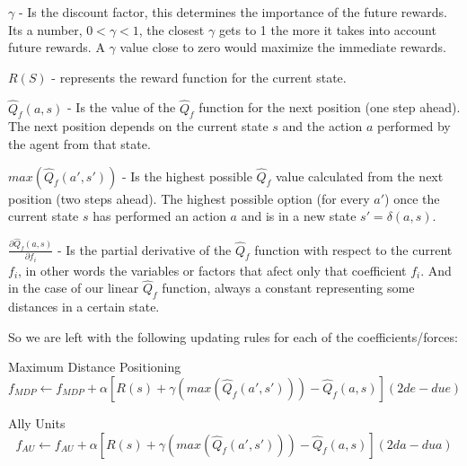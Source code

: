 \begin{flushleft}
$\gamma$  - Is the discount factor, this determines the importance of the future rewards. Its a number, $0 < \gamma < 1$, the closest $\gamma$ gets to 1 the more it takes into account future rewards. A $\gamma$ value close to zero would maximize the immediate rewards. 
\end{flushleft} 

\begin{flushleft}
$R(S)$ -  represents the reward function for the current state.
\end{flushleft} 

\begin{flushleft}
$\hat{Q}_f(a,s)$ - Is the value of the $\hat{Q}_f$ function for the next position (one step ahead). The next position depends on the current state $s$ and the action $a$ performed by the agent from that state.
\end{flushleft} 

\begin{flushleft}
$max(\hat{Q}_f(a',s'))$ - Is the highest possible $\hat{Q}_f$ value calculated from the next position (two steps ahead). The highest possible option (for every $a'$) once the current state $s$ has performed an action $a$ and is in a new state $s' = \delta(a,s)$. 
\end{flushleft} 

\begin{flushleft}
$\frac{\partial \hat{Q}_f(a,s)}{\partial f_i}$  - Is the partial derivative of the $\hat{Q}_f$ function with respect to the current $f_i$, in other words the variables or factors that afect only that coefficient $f_i$. And in the case of our  linear $\hat{Q}_f$ function, always a constant representing some distances in a certain state. 
\end{flushleft} 

\begin{flushleft}
So we are left with the following updating rules for each of the coefficients/forces:
\end{flushleft} 

\begin{flushleft}
Maximum Distance Positioning 
\begin{equation}
f_{MDP}  \leftarrow f_{MDP}  + \alpha [ R(s) + \gamma (max(\hat{Q}_{f} (a',s')))-\hat{Q}_{f} (a,s) ](2de - due)
\end{equation}
\end{flushleft} 

\begin{flushleft}
Ally Units
\begin{equation}
f_{AU}  \leftarrow f_{AU} + \alpha [ R(s) + \gamma (max(\hat{Q}_{f} (a',s')))-\hat{Q}_{f} (a,s) ](2da - dua)
\end{equation}
\end{flushleft} 

